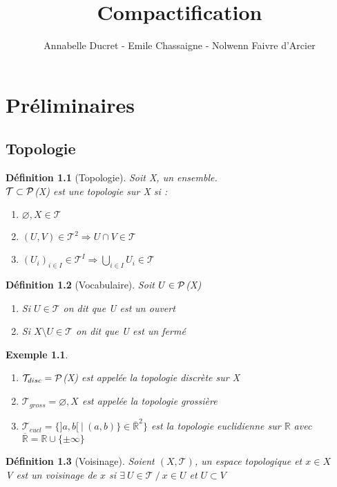 \documentclass{report}
\title{Compactification}
\author{Annabelle Ducret - Emile Chassaigne - Nolwenn Faivre d'Arcier}
\newtheorem{definition}{Définition}[section]
\theoremstyle{plain}
\newtheorem{exemple}{Exemple}[section]
\newcommand\T{\mathcal{T}}
\newcommand\R{\mathbb{R}}
\newcommand{\set}[2]{\{#1\:|\:#2\}}
\begin{document}
\maketitle

\chapter{Préliminaires}

	\section{Topologie}

		\begin{definition}[Topologie]
			Soit X, un ensemble.\\
			$\T \subset \cal{P}$(X) est une topologie sur X si :
				\begin{enumerate}
					\item $\varnothing, X \in \T$
					\item $(U,V) \in \T^2 \Rightarrow U \cap V \in \T$
					\item $(U_i)_{i\in I} \in \T^I \Rightarrow \bigcup\limits_{i\in I}^{} U_i \in \T$
				\end{enumerate}
		\end{definition}

		\begin{definition}[Vocabulaire]
			Soit $U \in \cal{P}$(X)
			\begin{enumerate}
				\item Si $U \in \T$ on dit que U est un ouvert
				\item Si $X\setminus U \in \T$ on dit que U est un fermé
			\end{enumerate}
		\end{definition}

		\begin{exemple}
			\begin{enumerate}
				\item $\T_{disc} = \cal{P}$(X) est appelée la topologie discrète sur X
				\item $\T_{gross} = {\varnothing,X}$ est appelée la topologie grossière
				\item $\T_{eucl} = \set{]a,b[}{(a,b)}\in \overline{\R}^2\}$ est la topologie euclidienne sur $\R$ avec $\overline{\R}=\R\cup\{\pm\infty\}$
			\end{enumerate}
		\end{exemple}

		\begin{definition}[Voisinage]
			Soient $(X, \T)$, un espace topologique et $x \in X$\\
			V est un voisinage de $x$ si $\exists\: U \in \T\: /\: x \in U$ et $U \subset V$
		\end{definition}
\end{document}
